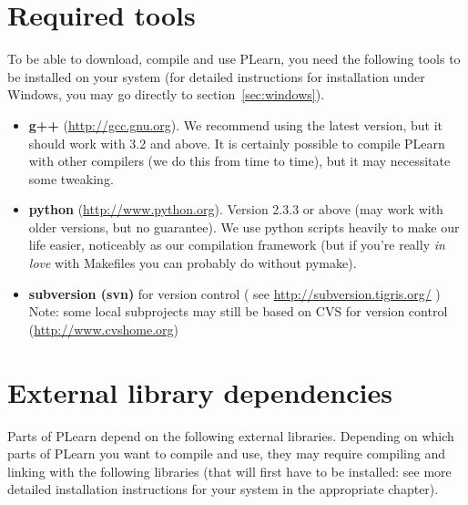 \documentclass[11pt]{book}
\begin{document}
\section{Required tools}

To be able to download, compile and use PLearn, you need the following
tools to be installed on your system (for detailed instructions for
installation under Windows, you may go directly to section~\ref{sec:windows}).
\begin{itemize}
\item {\bf g++} (\url{http://gcc.gnu.org}). We recommend using the latest version,
  but it should work with 3.2 and above. It is certainly possible to
  compile PLearn with other compilers (we do this from time to time), but
  it may necessitate some tweaking.
\item {\bf python} (\url{http://www.python.org}). Version 2.3.3 or above (may
  work with older versions, but no guarantee). We use python scripts
  heavily to make our life easier, noticeably as our compilation framework
  (but if you're really {\em in love} with Makefiles you can probably do without
  pymake).
\item {\bf subversion (svn)} for version control ( see \url{http://subversion.tigris.org/} )
Note: some local subprojects may still be based on CVS for version control (\url{http://www.cvshome.org})
\end{itemize}


\section{External library dependencies}

Parts of PLearn depend on the following external libraries. Depending on
which parts of PLearn you want to compile and use, they may require
compiling and linking with the following libraries (that will first have to
be installed: see more detailed installation instructions for your system
in the appropriate chapter).
\end{document}
